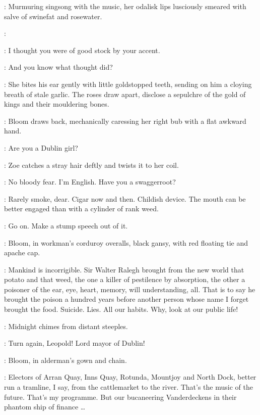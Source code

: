 :
Murmuring singsong with the music, her odalisk lips lusciously
smeared with salve of swinefat and rosewater.

\Zoe:

\Bloom:
I thought you were of good stock by your accent.

\Zoe:
And you know what thought did?

:
She bites his ear gently with little goldstopped teeth,
sending on him a cloying breath of stale garlic.
The roses draw apart, disclose a sepulchre of the gold of kings
and their mouldering bones.

:
Bloom draws back, mechanically caressing her right bub with a flat awkward hand.

\Bloom:
Are you a Dublin girl?

:
Zoe catches a stray hair deftly and twists it to her coil.

\Zoe:
No bloody fear.
I'm English.
Have you a swaggerroot?

\Bloom:
Rarely smoke, dear.
Cigar now and then.
Childish device.
The mouth can be better engaged than with a cylinder of rank weed.

\Zoe:
Go on.
Make a stump speech out of it.


\par

:
Bloom, in workman's corduroy overalls,
black gansy, with red floating tie and apache cap.

\Bloom:
Mankind is incorrigible.
Sir Walter Ralegh brought from the new world that potato and that weed,
the one a killer of pestilence by absorption,
the other a poisoner of the ear, eye, heart, memory, will understanding, all.
That is to say he brought the poison a hundred years
before another person whose name I forget brought the food.
Suicide. Lies. All our habits.
Why, look at our public life!

:
Midnight chimes from distant steeples.

\Chimes:
Turn again, Leopold!
Lord mayor of Dublin!

:
Bloom, in alderman's gown and chain.

\Bloom:
Electors of Arran Quay, Inns Quay, Rotunda, Mountjoy and North Dock,
better run a tramline, I say, from the cattlemarket to the river.
That's the music of the future.
That's my programme.
But our bucaneering Vanderdeckens in their phantom ship of finance \ldots%

